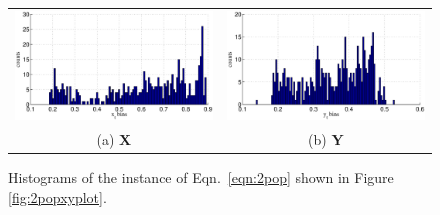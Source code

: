 \begin{figure}[ht]
\begin{tabular}{cc}
\includegraphics[scale=0.5]{CoupLogMapExample_Xhist.eps} & \includegraphics[scale=0.5]{CoupLogMapExample_Yhist.eps} \\
(a) $\mathbf{X}$ & (b) $\mathbf{Y}$
\end{tabular}
\caption{Histograms of the instance of Eqn.\ \ref{eqn:2pop} shown in Figure \ref{fig:2popxyplot}.}
\label{fig:2popxyhist}
\end{figure}

